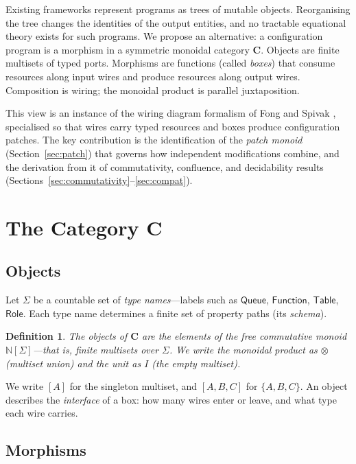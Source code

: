 \documentclass[11pt]{article}
\newtheorem{definition}[theorem]{Definition}
\newcommand{\cat}[1]{\mathbf{#1}}
\newcommand{\tensor}{\otimes}
\begin{document}
    Existing frameworks represent programs as trees of mutable objects. Reorganising the
    tree changes the identities of the output entities, and no tractable equational theory
    exists for such programs. We propose an alternative: a configuration program is a
    morphism in a symmetric monoidal category $\cat{C}$. Objects are finite multisets of
    typed ports. Morphisms are functions (called \emph{boxes}) that consume resources along
    input wires and produce resources along output wires. Composition is wiring; the
    monoidal product is parallel juxtaposition.

    This view is an instance of the wiring diagram formalism of Fong and Spivak
    \cite{fong2019invitation}, specialised so that wires carry typed resources and boxes
    produce configuration patches. The key contribution is the identification of the
    \emph{patch monoid} (Section~\ref{sec:patch}) that governs how independent
    modifications combine, and the derivation from it of commutativity, confluence, and
    decidability results (Sections~\ref{sec:commutativity}--\ref{sec:compat}).

    \section{The Category $\cat{C}$}

    \subsection{Objects}

    Let $\Sigma$ be a countable set of \emph{type names}---labels such as
    $\mathsf{Queue}$, $\mathsf{Function}$, $\mathsf{Table}$, $\mathsf{Role}$. Each type
    name determines a finite set of property paths (its \emph{schema}).

    \begin{definition}
        The objects of $\cat{C}$ are the elements of the free commutative monoid
        $\mathbb{N}[\Sigma]$---that is, finite multisets over $\Sigma$. We write the
        monoidal product as $\tensor$ (multiset union) and the unit as $I$ (the empty
        multiset).
    \end{definition}

    We write $[A]$ for the singleton multiset, and $[A, B, C]$ for $\{A, B, C\}$. An
    object describes the \emph{interface} of a box: how many wires enter or leave, and
    what type each wire carries.

    \subsection{Morphisms}
\end{document}
